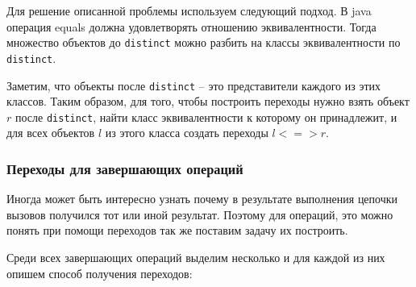 Для решение описанной проблемы используем следующий подход. В java операция equals должна удовлетворять отношению эквивалентности. Тогда множество объектов до \texttt{distinct} можно разбить на классы эквивалентности по \texttt{distinct}. 

Заметим, что объекты после \texttt{distinct} -- это представители каждого из этих классов. Таким образом, для того, чтобы построить переходы нужно взять объект $r$ после \texttt{distinct}, найти класс эквивалентности к которому он принадлежит, и для всех объектов $l$ из этого класса создать переходы $l <=> r$. 

\subsubsection{Переходы для завершающих операций}
Иногда может быть интересно узнать почему в результате выполнения цепочки вызовов получился тот или иной результат. Поэтому для операций, это можно понять при помощи переходов так же поставим задачу их построить.

Среди всех завершающих операций выделим несколько и для каждой из них опишем способ получения переходов:


